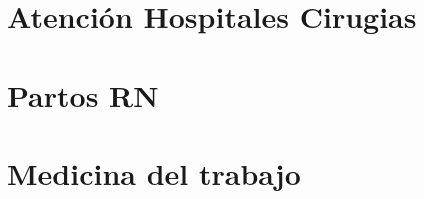 \documentclass[
]{book}
\begin{document}
\hypertarget{atenciuxf3n-hospitales-cirugias}{%
\chapter{Atención Hospitales Cirugias}\label{atenciuxf3n-hospitales-cirugias}}

\hypertarget{partos-rn}{%
\chapter{Partos RN}\label{partos-rn}}

\hypertarget{medicina-del-trabajo}{%
\chapter{Medicina del trabajo}\label{medicina-del-trabajo}}

  
\end{document}
